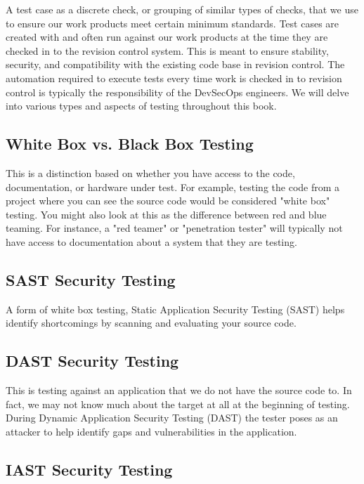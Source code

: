 \justify{}
A test case as a discrete check, or grouping of similar types of checks,
that we use to ensure our work products meet certain minimum standards. Test cases are created with
and often run against our work products at the time they are checked in to the revision control system.
This is meant to ensure stability, security, and compatibility with the existing code base in revision
control. The automation required to execute tests every time work is checked in to
revision control is typically the responsibility of the DevSecOps engineers. We will delve into various
types and aspects of testing throughout this book.

\subsection{White Box vs. Black Box Testing}

\justify{}
This is a distinction based on whether you have access to the code, documentation, or hardware under test.
For example, testing the code from a project where you can see the source code would be considered "white box"
testing. You might also look at this as the difference between red and blue
teaming. For instance, a "red teamer" or "penetration tester" will typically not have
access to documentation about a system that they are testing.

\subsection{SAST Security Testing}

\justify{}
A form of white box testing, Static Application Security Testing (SAST) helps identify
shortcomings by scanning and evaluating your source code.

\subsection{DAST Security Testing}

\justify{}
This is testing against an application that we do not have the source code to. In fact, we may not know much
about the target at all at the beginning of testing. During Dynamic Application Security Testing (DAST)
the tester poses as an attacker to help identify gaps and vulnerabilities in the application.

\subsection{IAST Security Testing}

